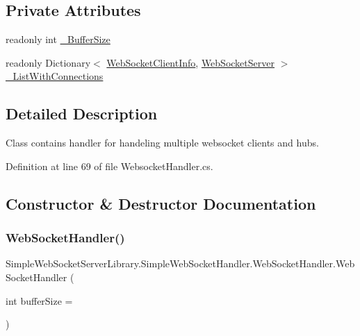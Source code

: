 \subsection*{Private Attributes}
\begin{DoxyCompactItemize}
\item 
readonly int \mbox{\hyperlink{class_simple_web_socket_server_library_1_1_simple_web_socket_handler_1_1_web_socket_handler_a82f255d10f7ada8915b0083a90aa488e}{\+\_\+\+Buffer\+Size}}
\item 
readonly Dictionary$<$ \mbox{\hyperlink{class_simple_web_socket_server_library_1_1_web_socket_client_info}{Web\+Socket\+Client\+Info}}, \mbox{\hyperlink{class_simple_web_socket_server_library_1_1_w_socket_server_1_1_web_socket_server}{Web\+Socket\+Server}} $>$ \mbox{\hyperlink{class_simple_web_socket_server_library_1_1_simple_web_socket_handler_1_1_web_socket_handler_a4cba1d5137e38a568d552bc6c6c6d68c}{\+\_\+\+List\+With\+Connections}}
\end{DoxyCompactItemize}


\subsection{Detailed Description}
Class contains handler for handeling multiple websocket clients and hubs. 



Definition at line 69 of file Websocket\+Handler.\+cs.



\subsection{Constructor \& Destructor Documentation}
\mbox{\label{class_simple_web_socket_server_library_1_1_simple_web_socket_handler_1_1_web_socket_handler_a10096ce5b5af80b4e5656e6d1d8ad485}} 
\subsubsection{\texorpdfstring{Web\+Socket\+Handler()}{WebSocketHandler()}}
{\footnotesize\ttfamily Simple\+Web\+Socket\+Server\+Library.\+Simple\+Web\+Socket\+Handler.\+Web\+Socket\+Handler.\+Web\+Socket\+Handler (\begin{DoxyParamCaption}\item[{int}]{buffer\+Size = {} }\end{DoxyParamCaption})}




